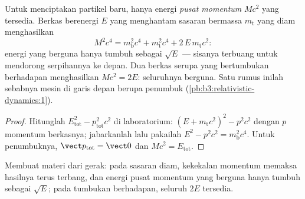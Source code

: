 \begin{proposition}\label{prop:b3:relativistic-dynamics:threshold}
Untuk menciptakan partikel baru, hanya energi \emph{pusat momentum}
$Mc^2$ yang tersedia. Berkas berenergi $E$ yang menghantam sasaran
bermassa $m_{\text{t}}$ yang diam menghasilkan
\[
M^2c^4 = m_{\text{b}}^2c^4 + m_{\text{t}}^2c^4 +
2\,E\,m_{\text{t}}c^2 :
\]
energi yang berguna hanya tumbuh sebagai $\sqrt E$ --- sisanya
terbuang untuk mendorong serpihannya ke depan. Dua berkas serupa yang
bertumbukan berhadapan menghasilkan $Mc^2 = 2E$: seluruhnya berguna.
Satu rumus inilah sebabnya mesin di garis depan berupa penumbuk
(\cref{pb:b3:relativistic-dynamics:1}).
\end{proposition}

\begin{proof}
Hitunglah $E_{\text{tot}}^2 - p_{\text{tot}}^2c^2$ di laboratorium:
$(E + m_{\text{t}}c^2)^2 - p^2c^2$ dengan $p$ momentum berkasnya;
jabarkanlah lalu pakailah $E^2 - p^2c^2 = m_{\text{b}}^2c^4$. Untuk
penumbuknya, $\vect p_{\text{tot}} = \vect 0$ dan $Mc^2 = E_{\text{tot}}$.
\end{proof}

\begin{omfigure}

{\small Membuat materi dari gerak: pada sasaran diam, kekekalan
momentum memaksa hasilnya terus terbang, dan energi pusat momentum yang
berguna hanya tumbuh sebagai $\sqrt E$; pada tumbukan berhadapan,
seluruh $2E$ tersedia.}
\end{omfigure}

